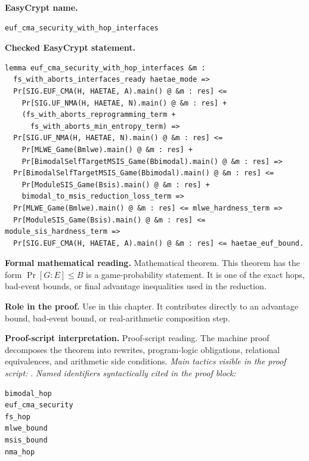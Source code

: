 \begin{formaltheorem}
\noindent\textbf{EasyCrypt name.}
\begin{lstlisting}[language=EasyCrypt,basicstyle=\ttfamily\scriptsize]
euf_cma_security_with_hop_interfaces
\end{lstlisting}
\noindent\textbf{Checked EasyCrypt statement.}
\begin{lstlisting}[language=EasyCrypt,basicstyle=\ttfamily\scriptsize]
lemma euf_cma_security_with_hop_interfaces &m :
  fs_with_aborts_interfaces_ready haetae_mode =>
  Pr[SIG.EUF_CMA(H, HAETAE, A).main() @ &m : res] <=
    Pr[SIG.UF_NMA(H, HAETAE, N).main() @ &m : res] +
    (fs_with_aborts_reprogramming_term +
      fs_with_aborts_min_entropy_term) =>
  Pr[SIG.UF_NMA(H, HAETAE, N).main() @ &m : res] <=
    Pr[MLWE_Game(Bmlwe).main() @ &m : res] +
    Pr[BimodalSelfTargetMSIS_Game(Bbimodal).main() @ &m : res] =>
  Pr[BimodalSelfTargetMSIS_Game(Bbimodal).main() @ &m : res] <=
    Pr[ModuleSIS_Game(Bsis).main() @ &m : res] +
    bimodal_to_msis_reduction_loss_term =>
  Pr[MLWE_Game(Bmlwe).main() @ &m : res] <= mlwe_hardness_term =>
  Pr[ModuleSIS_Game(Bsis).main() @ &m : res] <= module_sis_hardness_term =>
  Pr[SIG.EUF_CMA(H, HAETAE, A).main() @ &m : res] <= haetae_euf_bound.
\end{lstlisting}
\noindent\textbf{Formal mathematical reading.}
Mathematical theorem. This theorem has the form \(\Pr[G:E] \le B\) is a game-probability statement.  It is one of the exact hops, bad-event bounds, or final advantage inequalities used in the reduction.

\noindent\textbf{Role in the proof.}
Use in this chapter. It contributes directly to an advantage bound, bad-event bound, or real-arithmetic composition step.

\noindent\textbf{Proof-script interpretation.}
Proof-script reading. The machine proof decomposes the theorem into rewrites, program-logic obligations, relational equivalences, and arithmetic side conditions.
\emph{Main tactics visible in the proof script:} .
\emph{Named identifiers syntactically cited in the proof block:}
\begin{lstlisting}[language=EasyCrypt,basicstyle=\ttfamily\scriptsize]
bimodal_hop
euf_cma_security
fs_hop
mlwe_bound
msis_bound
nma_hop
\end{lstlisting}

\end{formaltheorem}

